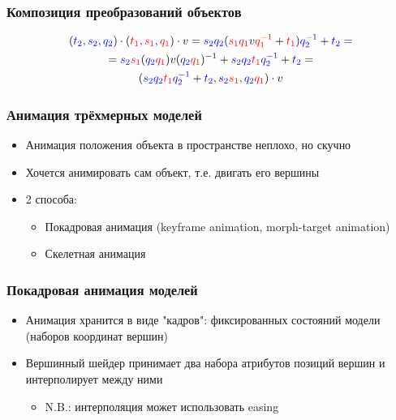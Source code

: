 \documentclass{beamer}
\begin{document}
\begin{frame}[fragile]
\frametitle{Композиция преобразований объектов}
\begin{multline}
({\color{blue}t_2},{\color{blue}s_2},{\color{blue}q_2}) \cdot ({\color{red}t_1},{\color{red}s_1},{\color{red}q_1}) \cdot v = {\color{blue}s_2}{\color{blue}q_2}({\color{red}s_1}{\color{red}q_1}v{\color{red}q_1^{-1}} + {\color{red}t_1}){\color{blue}q_2^{-1}} + {\color{blue}t_2} = \\
= {\color{blue}s_2}{\color{red}s_1} ({\color{blue}q_2}{\color{red}q_1}) v ({\color{blue}q_2}{\color{red}q_1})^{-1} + {\color{blue}s_2}{\color{blue}q_2}{\color{red}t_1}{\color{blue}q_2^{-1}} + {\color{blue}t_2} = \\
({\color{blue}s_2}{\color{blue}q_2}{\color{red}t_1}{\color{blue}q_2^{-1}} + {\color{blue}t_2}, {\color{blue}s_2}{\color{red}s_1}, {\color{blue}q_2}{\color{red}q_1}) \cdot v
\end{multline}
\end{frame}

\begin{frame}[fragile]
\frametitle{Анимация трёхмерных моделей}
\begin{itemize}
\item Анимация положения объекта в пространстве \textendash{} неплохо, но скучно
\item Хочется анимировать сам объект, т.е. двигать его вершины
\pause
\item 2 способа:
\begin{itemize}
\item Покадровая анимация (keyframe animation, morph-target animation)
\item Скелетная анимация
\end{itemize}
\end{itemize}
\end{frame}

\begin{frame}[fragile]
\frametitle{Покадровая анимация моделей}
\begin{itemize}
\item Анимация хранится в виде "кадров": фиксированных состояний модели (наборов координат вершин)
\pause
\item Вершинный шейдер принимает два набора атрибутов позиций вершин и интерполирует между ними
\begin{itemize}
\item N.B.: интерполяция может использовать easing
\end{itemize}
\end{itemize}
\end{frame}
\end{document}
